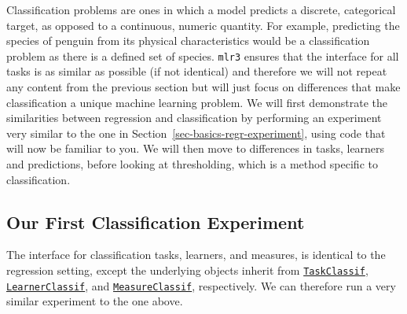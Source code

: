 Classification problems are ones in which a model
predicts a discrete, categorical target, as opposed to a continuous,
numeric quantity. For example, predicting the species of penguin from
its physical characteristics would be a classification problem as there
is a defined set of species. \texttt{mlr3} ensures that the interface
for all tasks is as similar as possible (if not identical) and therefore
we will not repeat any content from the previous section but will just
focus on differences that make classification a unique machine learning
problem. We will first demonstrate the similarities between regression
and classification by performing an experiment very similar to the one
in Section~\ref{sec-basics-regr-experiment}, using code that will now be
familiar to you. We will then move to differences in tasks, learners and
predictions, before looking at thresholding, which
is a method specific to classification.

\hypertarget{sec-basics-classif-experiment}{%
\subsection{Our First Classification
Experiment}\label{sec-basics-classif-experiment}}

The interface for classification tasks, learners, and measures, is
identical to the regression setting, except the underlying objects
inherit from
\href{https://mlr3.mlr-org.com/reference/TaskClassif.html}{\texttt{TaskClassif}},
\href{https://mlr3.mlr-org.com/reference/LearnerClassif.html}{\texttt{LearnerClassif}},
and
\href{https://mlr3.mlr-org.com/reference/MeasureClassif.html}{\texttt{MeasureClassif}},
respectively. We can therefore run a very similar experiment to the one
above.


